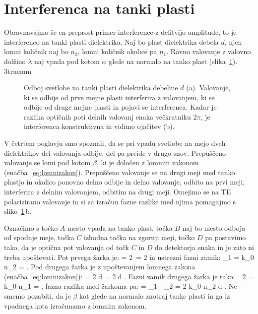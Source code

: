 \section{Interferenca na tanki plasti}
Obravnavajmo še en preprost primer interference z delitvijo amplitude, to je 
interferenco na tanki plasti dielektrika. Naj bo plast dielektrika
debela $d$, njen lomni količnik naj bo $n_2$, lomni količnik okolice
pa $n_1$. Ravno valovanje z valovno dolžino $\lambda$ naj vpada pod kotom
$\alpha$ glede na normalo na tanko plast (slika~\ref{fig:06_plast}).
\vglue3truemm
\begin{figure}[ht]
\centering
\def\svgwidth{130truemm} 

\caption{Odboj svetlobe na tanki plasti dielektrika debeline $d$ (a). Valovanje,
ki se odbije od prve mejne plasti interferira z valovanjem, ki se odbije od 
druge mejne plasti in pojavi se interferenca.
Kadar je razlika optičnih poti delnih valovanj enaka večkratniku $2\pi$,
je interferenca konstruktivna in vidimo ojačitev (b). 
}
\label{fig:06_plast}
\end{figure}

V četrtem poglavju smo spoznali, da se pri vpadu svetlobe na mejo dveh dielektrikov
del valovanja odbije, del pa preide v drugo snov. Prepuščeno valovanje se lomi pod kotom
$\beta$, ki je določen z lomnim zakonom (enačba~\ref{eq:lomnizakon}). Prepuščeno valovanje
se na drugi meji med tanko plastjo in okolico ponovno delno odbije in delno valovanje, 
odbito na prvi meji, interferira z delnim valovanjem, odbitim na drugi meji. Omejimo
se na TE polarizirano valovanje in si za
izračun fazne razlike med njima pomagajmo s sliko~\ref{fig:06_plast}\,b.

Označimo s točko $A$ mesto vpada na tanko plast, točka $B$ naj bo mesto odboja 
od spodnje meje, točka $C$ izhodna točka na zgornji meji, točko $D$ pa postavimo
tako, da je optična pot valovanja od točk $C$ in $D$ do detektorja enaka in je 
zato ni treba upoštevati. Pot prvega žarka je:
\beq
{}= 2\, = 2 
\label{eq:06_30}
\eeq
in ustrezni fazni zamik:
\beq
\phi_1 = k_0 n_2  = .
\label{eq:06_31}
\eeq
Pod drugega žarka je z upoštevanjem lomnega zakona (enačba~\ref{eq:lomnizakon}):
\beq
{} = 2 d \tan \beta \sin \alpha = 2 d \tan \beta {}.
\label{eq:06_32}
\eeq
Fazni zamik drugega žarka je tako:
\beq
\phi_2 = k_0 n_1  = ,
\label{eq:06_33}
\eeq
fazna razlika med žarkoma pa:
\beq
\phi  = \phi_1 - \phi_2 = 2 k_0 n_2 d \cos \beta.
\label{eq:06_34}
\eeq
Ne smemo pozabiti, da je $\beta$ kot glede na normalo znotraj tanke plasti in ga iz 
vpadnega kota izračunamo z lomnim zakonom. 

